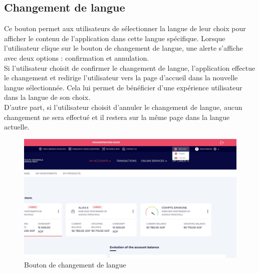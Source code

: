 \newpage

\subsection{Changement de langue}
Ce bouton permet aux utilisateurs de sélectionner la langue de leur choix pour afficher le contenu de l'application dans cette langue spécifique. Lorsque l'utilisateur clique sur le bouton de changement de langue, une alerte s'affiche avec deux options : confirmation et annulation.\\

Si l'utilisateur choisit de confirmer le changement de langue, l'application effectue le changement et redirige l'utilisateur vers la page d'accueil dans la nouvelle langue sélectionnée. Cela lui permet de bénéficier d'une expérience utilisateur dans la langue de son choix.\\

D'autre part, si l'utilisateur choisit d'annuler le changement de langue, aucun changement ne sera effectué et il restera sur la même page dans la langue actuelle.
\begin{figure}[!ht]
    \centering %
        \includegraphics[width=16cm]{images/screens/switch/desktop-switch.png}
    \caption{Bouton de changement de langue}
\end{figure}

